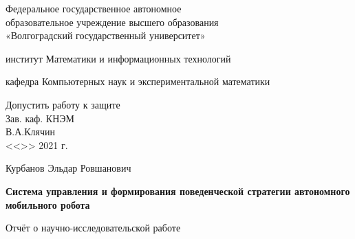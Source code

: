 \documentclass[14pt,a4paper]{scrartcl}
\begin{document}
\begin{titlepage}
	\begin{center}
	    Федеральное государственное автономное \\ 
	    образовательное учреждение высшего образования \\
	    «Волгоградский государственный университет» \\
	    
	    \vspace{0.5cm}
	    
	    институт Математики и информационных технологий
	    
	    кафедра Компьютерных наук и экспериментальной математики
	    \vspace{1.5cm}
	    
	    \newlength{\MLL}
	
		\hfill\begin{minipage}{0.4\textwidth}
	 		Допустить работу к защите \\
	 		Зав. каф. КНЭМ \\
	 	 	\underline{\hspace{3.5cm}}В.А.Клячин \\
	  		<<\underline{\hspace{1cm}}>>\underline{\hspace{3.0cm}} 2021 г. 
		\end{minipage}
		
	    \vspace{1.5cm}	
	
	    Курбанов Эльдар Ровшанович
	    
	    \begin{spacing}{1.3}
    	    	\textbf{Система управления и формирования поведенческой стратегии автономного мобильного робота}
	    \end{spacing}
	    
	    Отчёт о научно-исследовательской работе
	\end{center}

	\vfill
	

\end{titlepage}
\end{document}
